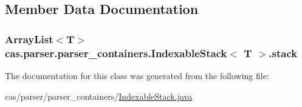 \subsection{Member Data Documentation}
\hypertarget{classcas_1_1parser_1_1parser__containers_1_1_indexable_stack_3_01_t_01_4_a1c0b5f377c93609c56559585b4d8312e}{
\subsubsection[{stack}]{\setlength{\rightskip}{0pt plus 5cm}Array\-List$<$T$>$ cas.\-parser.\-parser\-\_\-containers.\-Indexable\-Stack$<$ T $>$.stack\hspace{0.3cm}{\ttfamily [protected]}}}\label{classcas_1_1parser_1_1parser__containers_1_1_indexable_stack_3_01_t_01_4_a1c0b5f377c93609c56559585b4d8312e}


The documentation for this class was generated from the following file\-:\begin{DoxyCompactItemize}
\item 
cas/parser/parser\-\_\-containers/\hyperlink{_indexable_stack_8java}{Indexable\-Stack.\-java}\end{DoxyCompactItemize}
